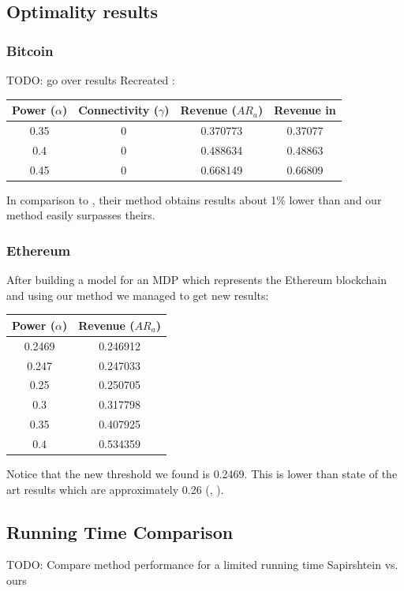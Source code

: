\documentclass{article}
\begin{document}
\subsection{Optimality results}
\subsubsection{Bitcoin}
TODO: go over results
Recreated \cite{sapirshtein2016optimal}:
\begin{center}
\begin{tabular}{ |c|c|c|c| } 
 \hline
 Power ($\alpha$) & Connectivity ($\gamma$) & Revenue ($AR_a$) & Revenue in \cite{sapirshtein2016optimal}\\
 \hline
 0.35 & 0 & 0.370773 & 0.37077\\
 \hline
 0.4 & 0 & 0.488634 & 0.48863\\
 \hline
 0.45 & 0 & 0.668149 & 0.66809\\
 \hline
\end{tabular}
\end{center}

In comparison to \cite{hou2019squirrl}, their method obtains results about 1\% lower than \cite{sapirshtein2016optimal} and our method easily surpasses theirs.

\subsubsection{Ethereum}
After building a model for an MDP which represents the Ethereum blockchain and using our method we managed to get new results:
\begin{center}
\begin{tabular}{ |c|c| } 
 \hline
 Power ($\alpha$) & Revenue ($AR_a$)\\
 \hline
 0.2469 & 0.246912\\
 \hline
 0.247 & 0.247033\\
 \hline
 0.25 & 0.250705\\
 \hline
 0.3 & 0.317798\\
 \hline
 0.35 & 0.407925\\
 \hline
 0.4 & 0.534359\\
 \hline
\end{tabular}
\end{center}
Notice that the new threshold we found is 0.2469. This is lower than state of the art results which are approximately 0.26 (\cite{ritz2018impact}, \cite{feng2019selfish}).

\subsection{Running Time Comparison}
TODO: Compare method performance for a limited running time Sapirshtein vs. ours
\end{document}
